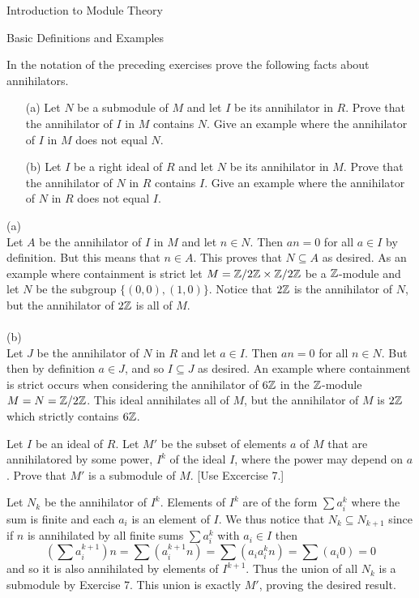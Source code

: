 \begin{chapter}{Introduction to Module Theory}
\begin{section}{Basic Definitions and Examples}
\begin{problem}\label{ex:10.1.12}
In the notation of the preceding exercises prove the following facts about annihilators.
\begin{enumerate}
\item[(a)] Let $N$ be a submodule of $M$ and let $I$ be its annihilator in $R$. Prove that the annihilator of $I$ in $M$ contains $N$. Give an example where the annihilator of $I$ in $M$ does not equal $N$. 
\item[(b)] Let $I$ be a right ideal of $R$ and let $N$ be its annihilator in $M$. Prove that the annihilator of $N$ in $R$ contains $I$. Give an example where the annihilator of $N$ in $R$ does not equal $I$. 
\end{enumerate}
\end{problem}
\begin{solution}
(a)\\
Let $A$ be the annihilator of $I$ in $M$ and let $n\in N$. Then $an = 0$ for all $a\in I$ by definition. But this means that $n\in A$. This proves that $N\subseteq A$ as desired. As an example where containment is strict let $M = \mathbb{Z}/2\mathbb{Z}\times \mathbb{Z}/2\mathbb{Z}$ be a $\mathbb{Z}$-module and let $N$ be the subgroup $\{(0,0),(1,0)\}$. Notice that $2\mathbb{Z}$ is the annihilator of $N$, but the annihilator of $2\mathbb{Z}$ is all of $M$.  \\\\
(b)\\
Let $J$ be the annihilator of $N$ in $R$ and let $a\in I$. Then $an = 0$ for all $n\in N$. But then by definition $a\in J$, and so $I\subseteq J$ as desired. An example where containment is strict occurs when considering the annihilator of $6\mathbb{Z}$ in the $\mathbb{Z}$-module $M= N = \mathbb{Z}/2\mathbb{Z}$. This ideal annihilates all of $M$, but the annihilator of $M$ is $2\mathbb{Z}$ which strictly contains $6\mathbb{Z}$. 

\end{solution}\oneperpage



\begin{problem}\label{ex:10.1.13}
Let $I$ be an ideal of $R$. Let $M'$ be the subset of elements $a$ of $M$ that are annihilatored by some power, $I^k$ of the ideal $I$, where the power may depend on $a$. Prove that $M'$ is a submodule of $M$. [Use Excercise 7.]
\end{problem}
\begin{solution}
Let $N_k$ be the annihilator of $I^k$. Elements of $I^k$ are of the form $\sum a_i^k$ where the sum is finite and each $a_i$ is an element of $I$. We thus notice that $N_k\subseteq N_{k+1}$ since if $n$ is annihilated by all finite sums $\sum a_i^k$ with $a_i\in I$ then \[
\left(\sum a_i^{k+1}\right)n =\sum (a_i^{k+1}n) = \sum (a_i a_i^{k}n) = \sum (a_i 0) = 0
\]
and so it is also annihilated by elements of $I^{k+1}$. Thus the union of all $N_k$ is a submodule by Exercise 7. This union is exactly $M'$, proving the desired result.
\end{solution}\oneperpage




\end{section}
\end{chapter}
